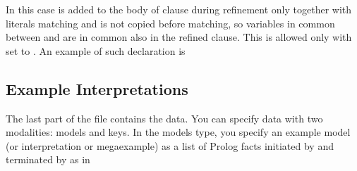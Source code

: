 \documentclass[letterpaper,10pt,english]{sphinxmanual}
\begin{document}
\sphinxAtStartPar
In this case  is added to the body of clause during refinement only together with literals matching  and  is not copied before matching, so variables in common between  and  are in common also in the refined clause. This is allowed only with  set to .
An example of such declaration is

\begin{sphinxVerbatim}[commandchars=\\\{\}]
\PYG{p}{[}\PYG{p}{]}
\end{sphinxVerbatim}


\subsection{Example Interpretations}
\label{\detokenize{index:example-interpretations}}
\sphinxAtStartPar
The last part of the file contains the data.
You can specify data with two modalities: models and keys.
In the models type, you specify an example model (or interpretation or megaexample) as a list of Prolog facts initiated by  and terminated by  as in

\begin{sphinxVerbatim}[commandchars=\\\{\}]
\end{sphinxVerbatim}
\end{document}
